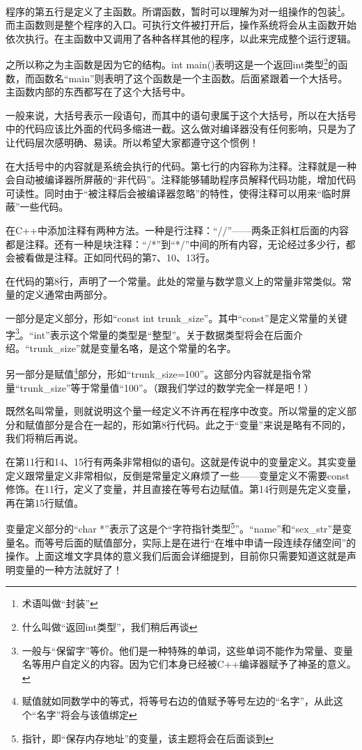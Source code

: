 程序的第五行是定义了主函数。所谓函数，暂时可以理解为对一组操作的包装\footnote{术语叫做“封装”}。而主函数则是整个程序的入口。可执行文件被打开后，操作系统将会从主函数开始依次执行。在主函数中又调用了各种各样其他的程序，以此来完成整个运行逻辑。

之所以称之为主函数是因为它的结构。int main()表明这是一个返回int类型\footnote{什么叫做“返回int类型”，我们稍后再谈}的函数，而函数名“main”则表明了这个函数是一个主函数。后面紧跟着一个大括号。主函数内部的东西都写在了这个大括号中。

一般来说，大括号表示一段语句，而其中的语句隶属于这个大括号，所以在大括号中的代码应该比外面的代码多缩进一截。这么做对编译器没有任何影响，只是为了让代码层次感明确、易读。所以希望大家都遵守这个惯例！

在大括号中的内容就是系统会执行的代码。第七行的内容称为注释。注释就是一种会自动被编译器所屏蔽的“非代码”。注释能够辅助程序员解释代码功能，增加代码可读性。同时由于“被注释后会被编译器忽略”的特性，使得注释可以用来“临时屏蔽”一些代码。

在C++中添加注释有两种方法。一种是行注释：“//”——两条正斜杠后面的内容都是注释。还有一种是块注释：“/*”到“*/”中间的所有内容，无论经过多少行，都会被看做是注释。正如同代码的第7、10、13行。

在代码的第8行，声明了一个常量。此处的常量与数学意义上的常量非常类似。常量的定义通常由两部分。

一部分是定义部分，形如“const int trunk\_size”。其中“const”是定义常量的关键字\footnote{一般与“保留字”等价。他们是一种特殊的单词，这些单词不能作为常量、变量名等用户自定义的内容。因为它们本身已经被C++编译器赋予了神圣的意义。}。“int”表示这个常量的类型是“整型”。关于数据类型将会在后面介绍。“trunk\_size”就是变量名咯，是这个常量的名字。

另一部分是赋值\footnote{赋值就如同数学中的等式，将等号右边的值赋予等号左边的“名字”，从此这个“名字”将会与该值绑定}部分，形如“trunk\_size=100”。这部分内容就是指令常量“trunk\_size”等于常量值“100”。（跟我们学过的数学完全一样是吧！）

既然名叫常量，则就说明这个量一经定义不许再在程序中改变。所以常量的定义部分和赋值部分是合在一起的，形如第8行代码。此之于“变量”来说是略有不同的，我们将稍后再说。

在第11行和14、15行有两条非常相似的语句。这就是传说中的变量定义。其实变量定义跟常量定义非常相似，反倒是常量定义麻烦了一些——变量定义不需要const修饰。在11行，定义了变量，并且直接在等号右边赋值。第14行则是先定义变量，再在第15行赋值。

变量定义部分的“char *”表示了这是个“字符指针类型\footnote{指针，即“保存内存地址”的变量，该主题将会在后面谈到}”。“name”和“sex\_str”是变量名。而等号后面的赋值部分，实际上是在进行“在堆中申请一段连续存储空间”的操作。上面这堆文字具体的意义我们后面会详细提到，目前你只需要知道这就是声明变量的一种方法就好了！

